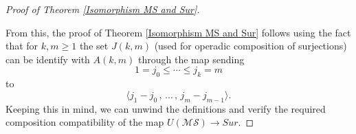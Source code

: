 \documentclass{amsart}
\newcommand{\MS}{\mathcal{MS}}
\theoremstyle{definition}
\begin{document}
\begin{proof} [Proof of Theorem \ref{Isomorphism MS and Sur}]
\begin{center}
{}
		\end{center}
		From this, the proof of Theorem \ref{Isomorphism MS and Sur} follows using the fact that for $k,m\geq1$ the set $J(k,m)$ (used for operadic composition of surjections) can be identify with $A(k,m)$ through the map sending 
		\begin{equation*}
		1 = j_0 \leq \cdots \leq j_k = m
		\end{equation*} 
		to 
		\begin{equation*}
		\big \langle j_1-j_0\,,\, \dots\,,\, j_m-j_{m-1} \big \rangle.
		\end{equation*}
		Keeping this in mind, we can unwind the definitions and verify the required composition compatibility of the map $U(\MS)\to Sur$.
	\end{proof}
	
\end{document}
